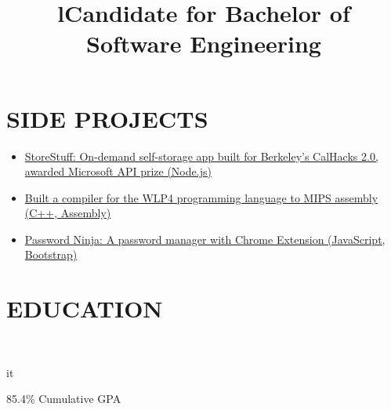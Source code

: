 \documentclass[]{res}
\begin{document}
\begin{resume}
\section{SIDE PROJECTS}
  \begin{itemize}
    \item \href{https://github.com/paulashbourne/storestuff}
      {StoreStuff: On-demand self-storage app built for Berkeley's CalHacks 2.0, awarded Microsoft API prize (Node.js)}
    \item \href{https://github.com/paulashbourne/wlp4compiler}
      {Built a compiler for the WLP4 programming language to MIPS assembly (C++, Assembly)}
    \item \href{http://password-ninja.com/}
      {Password Ninja: A password manager with Chrome Extension (JavaScript, Bootstrap)}
  \end{itemize}

\section{EDUCATION}
  \begin{format}  \\ \title{l}{it} \\ \body \end{format}
  \title{Candidate for Bachelor of Software Engineering}
  \begin{position}
    85.4\% Cumulative GPA
  \end{position}
\end{resume}
\end{document}
